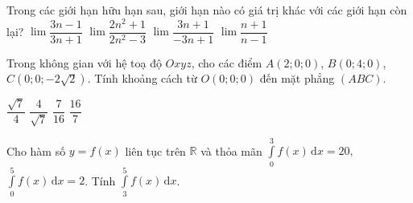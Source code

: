 \begin{ex}%
	Trong các giới hạn hữu hạn sau, giới hạn nào có giá trị khác với các giới hạn còn lại?
	\choice
	{$\lim\dfrac{3n-1}{3n+1}$}
	{$\lim\dfrac{2n^2+1}{2n^2-3}$}
	{\True$\lim\dfrac{3n+1}{-3n+1}$}
	{$\lim\dfrac{n+1}{n-1}$}
\end{ex}
\begin{ex}%
	Trong không gian với hệ toạ độ $Oxyz$, cho các điểm $A(2;0;0)$, $B(0;4;0)$, $C(0;0;-2\sqrt{2})$. Tính khoảng cách từ $O(0;0;0)$ đến mặt phẳng $(ABC)$.
	
	\choice
	{$\dfrac{\sqrt{7}}{4}$}
	{\True $\dfrac{4}{\sqrt{7}}$}
	{$\dfrac{7}{16}$}
	{$\dfrac{16}{7}$}
\end{ex}

\begin{ex} %
	Cho hàm số $y=f(x) $ liên tục trên $\mathbb{R}$ và thỏa mãn $\displaystyle \int\limits_{0}^{3} f(x) \mathrm{\, d} x=20,$ $\displaystyle \int\limits_{0}^{5} f(x) \mathrm{\, d} x=2$. Tính $\displaystyle \int\limits_{3}^{5} f(x) \mathrm{\, d} x$.
\end{ex}


